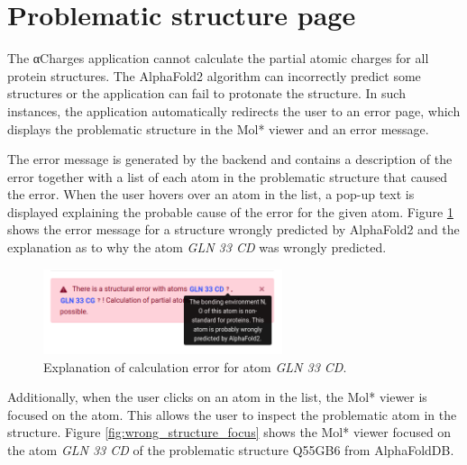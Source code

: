 \documentclass[
  digital,     %
  oneside,     %
  nosansbold,  %
  nocolorbold, %
  lof,         %
  lot,         %
]{fithesis4}
\begin{document}
\section{Problematic structure page}

The αCharges application cannot calculate the partial atomic charges for all protein structures. The AlphaFold2 algorithm can incorrectly predict some structures or the application can fail to protonate the structure. \cite{schindler2023alphacharges} In such instances, the application automatically redirects the user to an error page, which displays the problematic structure in the Mol* viewer and an error message.

The error message is generated by the backend and contains a description of the error together with a list of each atom in the problematic structure that caused the error. When the user hovers over an atom in the list, a pop-up text is displayed explaining the probable cause of the error for the given atom. Figure \ref{fig:wrong_structure_text} shows the error message for a structure wrongly predicted by AlphaFold2 and the explanation as to why the atom \textit{GLN 33 CD} was wrongly predicted.

\begin{figure}[htbp]
  \begin{center}
    \includegraphics[width=7cm]{figures/wrong_structure_text.png}
  \end{center}
  \caption{Explanation of calculation error for atom \textit{GLN 33 CD}.}
  \label{fig:wrong_structure_text}
\end{figure}

Additionally, when the user clicks on an atom in the list, the Mol* viewer is focused on the atom. This allows the user to inspect the problematic atom in the structure. Figure \ref{fig:wrong_structure_focus} shows the Mol* viewer focused on the atom \textit{GLN 33 CD} of the problematic structure Q55GB6 from AlphaFoldDB.
\end{document}
